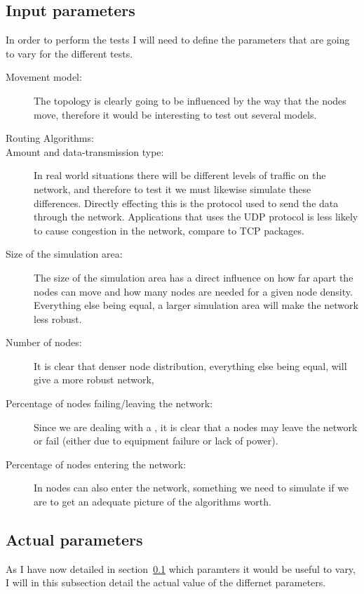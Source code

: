 \subsection{Input parameters}
\label{input_parameters}
In order to perform the tests I will need to define the parameters that are going to vary for the different tests.
\begin{description}
\item[Movement model:] The topology is clearly going to be influenced by the way that the nodes move, therefore it would be interesting to test out several models. 

\item[Routing Algorithms:] 

\item[Amount and data-transmission type:] In real world situations there will be different levels of traffic on the network, and therefore to test it we must likewise simulate these differences. Directly effecting this is the protocol used to send the data through the network. Applications that uses the UDP protocol is less likely to cause congestion in the network, compare to TCP packages.

\item[Size of the simulation area:] The size of the simulation area has a direct influence on how far apart the nodes can move and how many nodes are needed for a given node density. Everything else being equal, a larger simulation area will make the network less robust.

\item[Number of nodes:] It is clear that denser node distribution, everything else being equal, will give a more robust network,

\item[Percentage of nodes failing/leaving the network:] Since we are dealing with a \manet, it is clear that a nodes may leave the network or fail (either due to equipment failure or lack of power). 
\item[Percentage of nodes entering the network:] In \manet nodes can also enter the network, something we need to simulate if we are to get an adequate picture of the algorithms worth.
\end{description}


\subsection{Actual parameters}
As I have now detailed in section~\ref{input_parameters} which paramters it would be useful to vary, I will in this subsection detail the actual value of the differnet parameters. 

